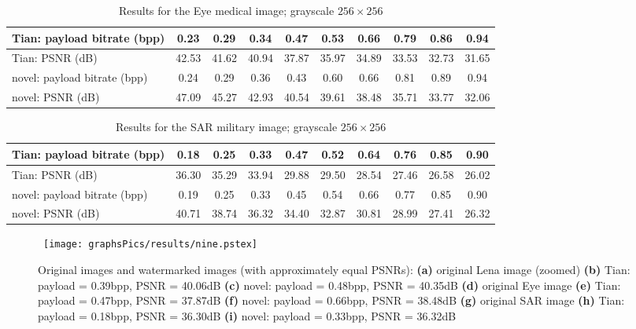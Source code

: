 \documentclass[10pt,twocolumn,letterpaper]{article}
\begin{document}
{\begin{table*}[!p]
\begin{center}
\vspace{-0.7cm}
\begin{tabular}{|l|c|c|c|c|c|c|c|c|c|} \hline
Tian: payload bitrate (bpp) 	& 0.23 	& 0.29 	& 0.34	& 0.47	& 0.53	& 0.66	& 0.79	& 0.86	& 0.94	\\ \hline
Tian: PSNR (dB)			& 42.53 & 41.62	& 40.94	& 37.87	& 35.97	& 34.89	& 33.53	& 32.73	& 31.65	\\ \hline \hline
novel: payload bitrate (bpp)	& 0.24  & 0.29  & 0.36	& 0.43	& 0.60	& 0.66	& 0.81	& 0.89	& 0.94	\\ \hline
novel: PSNR (dB)		& 47.09	& 45.27	& 42.93	& 40.54	& 39.61	& 38.48	& 35.71	& 33.77	& 32.06	\\ \hline
\end{tabular}
\caption{Results for the Eye medical image; grayscale $256 \times 256$}
\label{tab:eye256}
\end{center}
\setlength{\abovecaptionskip}{0cm}
\end{table*}

\begin{table*}[!p]
\begin{center}
\vspace{-0.7cm}
\begin{tabular}{|l|c|c|c|c|c|c|c|c|c|} \hline
Tian: payload bitrate (bpp) 	& 0.18 	& 0.25 	& 0.33	& 0.47	& 0.52	& 0.64	& 0.76 	& 0.85	& 0.90	\\ \hline
Tian: PSNR (dB)			& 36.30 & 35.29	& 33.94	& 29.88	& 29.50	& 28.54	& 27.46	& 26.58	& 26.02	\\ \hline \hline
novel: payload bitrate (bpp)	& 0.19 	& 0.25  & 0.33	& 0.45	& 0.54	& 0.66 	& 0.77 	& 0.85	& 0.90	\\ \hline
novel: PSNR (dB)		& 40.71	& 38.74	& 36.32	& 34.40	& 32.87	& 30.81	& 28.99	& 27.41	& 26.32	\\ \hline
\end{tabular}
\caption{Results for the SAR military image; grayscale $256 \times 256$}
\label{tab:SAR256}
\end{center}
\setlength{\abovecaptionskip}{0cm}
\end{table*}

\begin{figure*}[p]
\setlength{\abovecaptionskip}{-0.25cm}
	\vspace{-0.45cm}
\centerline{ \hbox{
        \texttt{[image: graphsPics/results/nine.pstex]}
}}
        \caption{Original images and watermarked images (with approximately equal PSNRs): 
	{\bf (a)} original Lena image (zoomed) {\bf (b)} Tian: payload = 0.39bpp, PSNR = 40.06dB 
	{\bf (c)} novel: payload = 0.48bpp, PSNR = 40.35dB
	{\bf (d)} original Eye image {\bf (e)} Tian: payload = 0.47bpp, PSNR = 37.87dB {\bf (f)} novel: payload = 0.66bpp, PSNR = 38.48dB
	{\bf (g)} original SAR image {\bf (h)} Tian: payload = 0.18bpp, PSNR = 36.30dB {\bf (i)} novel: payload = 0.33bpp, PSNR = 36.32dB}
        \label{fig:nineFigs}
\setlength{\abovecaptionskip}{0cm}
\end{figure*}


}
\end{document}
